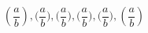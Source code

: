 \documentclass{book}
\begin{document}
\begin{equation*}
(\frac{a}{b}), \big(\frac{a}{b}\big),
\Big(\frac{a}{b}\Big), \bigg(\frac{a}{b}
\bigg), \Bigg(\frac{a}{b}\Bigg),
\left(\frac{a}{b}\right)
\end{equation*}
\end{document}
